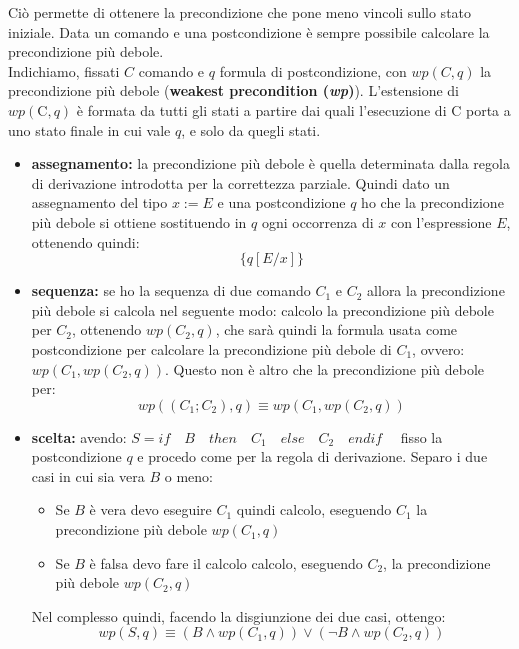 Ciò permette di ottenere la precondizione che pone meno vincoli sullo stato iniziale.
Data un comando e una postcondizione è sempre possibile calcolare la precondizione più debole. \\
Indichiamo, fissati $C$ comando e $q$ formula di postcondizione, con $wp(C, q)$ la precondizione più debole (\textbf{weakest precondition (\textit{wp})}). L’estensione di $wp(\text{C}, q)$ è formata da tutti gli stati a partire dai quali l’esecuzione di $\text{C}$ porta a uno stato finale in cui vale $q$, e solo da quegli stati.
\begin{itemize}
  \item \textbf{assegnamento:} la precondizione più debole è quella determinata dalla regola di derivazione introdotta per la correttezza parziale. Quindi dato un assegnamento del tipo $x := E$ e una postcondizione $q$ ho che la precondizione più debole si ottiene sostituendo in $q$ ogni occorrenza di $x$ con l'espressione $E$, ottenendo quindi: \[\{q[E/x]\}\]
  
  \item \textbf{sequenza:} se ho la sequenza di due comando $C_1$ e $C_2$ allora la precondizione più debole si calcola nel seguente modo: calcolo la precondizione più debole per $C_2$, ottenendo $wp(C_2,q)$, che sarà quindi la formula usata come postcondizione per calcolare la precondizione più debole di $C_1$, ovvero: $wp(C_1,wp(C_2,q))$. Questo non è altro che la precondizione più debole per: \[wp((C_1;C_2),q)\equiv wp(C_1,wp(C_2,q))\]
  
  \item \textbf{scelta:} avendo: $S = if \quad  B \quad then \quad C_1 \quad  else\quad  C_2\quad endif \quad$ fisso la postcondizione $q$ e procedo come per la regola di derivazione. Separo i due casi in cui sia vera $B$ o meno:
  \begin{itemize}
      \item Se $B$ è vera devo eseguire $C_1$ quindi calcolo, eseguendo $C_1$ la precondizione più debole $wp(C_1,q)$
      \item Se $B$ è falsa devo fare il calcolo calcolo, eseguendo $C_2$, la precondizione più debole $wp(C_2,q)$
  \end{itemize}   
  Nel complesso quindi, facendo la disgiunzione dei due casi, ottengo:    \[wp(S,q)\equiv(B\land wp(C_1,q))\lor (\neg B\land wp(C_2,q))\]
  
\end{itemize}